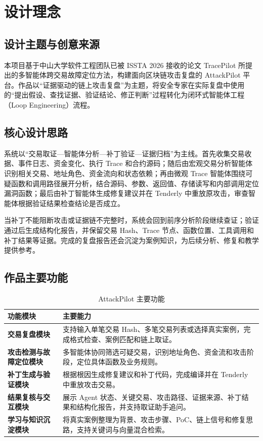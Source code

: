 \documentclass[UTF8,a4paper,12pt]{ctexart}
\begin{document}
\section{设计理念}

\subsection{设计主题与创意来源}

本项目基于中山大学软件工程团队已被 ISSTA 2026 接收的论文 TracePilot 所提出的多智能体跨交易故障定位方法，构建面向区块链攻击复盘的 AttackPilot 平台。作品以“证据驱动的链上攻击复盘”为主题，将安全专家在实际复盘中使用的“提出假设、查找证据、验证结论、修正判断”过程转化为闭环式智能体工程（Loop Engineering）流程。

\subsection{核心设计思路}

系统以“交易取证—智能体分析—补丁验证—证据归档”为主线。首先收集交易收据、事件日志、资金变化、执行 Trace 和合约源码；随后由宏观交易分析智能体识别相关交易、地址角色、资金流向和状态依赖；再由微观 Trace 智能体围绕可疑函数和调用路径展开分析，结合源码、参数、返回值、存储读写和内部调用定位漏洞函数；最后由补丁智能体生成修复建议并在 Tenderly 中重放原攻击，审查智能体根据验证结果检查结论是否成立。

当补丁不能阻断攻击或证据链不完整时，系统会回到前序分析阶段继续查证；验证通过后生成结构化报告，并保留交易 Hash、Trace 节点、函数位置、工具调用和补丁结果等证据。完成的复盘报告还会沉淀为案例知识，为后续分析、修复和教学提供参考。

\subsection{作品主要功能}

\begin{table}[H]
  \centering
  \caption{AttackPilot 主要功能}
  \begin{tabularx}{0.96\textwidth}{>{\bfseries}p{}X}
    \toprule
    功能模块 & 主要能力 \\
    \midrule
    交易复盘模块 & 支持输入单笔交易 Hash、多笔交易列表或选择真实案例，完成格式检查、案例匹配和链上取证。 \\
    攻击检测与故障定位模块 & 多智能体协同筛选可疑交易，识别地址角色、资金流和攻击阶段，定位具体函数及业务规则。 \\
    补丁生成与验证模块 & 根据根因生成修复建议和补丁代码，完成编译并在 Tenderly 中重放攻击交易。 \\
    结果复核与交互模块 & 展示 Agent 状态、关键交易、攻击路径、证据来源、补丁结果和结构化报告，并支持取证助手追问。 \\
    学习与知识沉淀模块 & 将真实案例整理为背景、攻击步骤、PoC、链上信号和修复思路，支持关键词与向量混合检索。 \\
    \bottomrule
  \end{tabularx}
\end{table}
\end{document}
